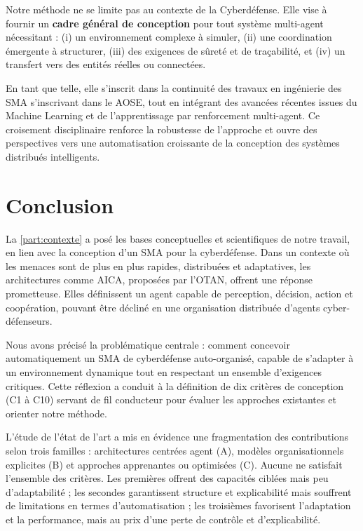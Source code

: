 Notre méthode ne se limite pas au contexte de la Cyberdéfense. Elle vise à fournir un \textbf{cadre général de conception} pour tout système multi-agent nécessitant : (i) un environnement complexe à simuler, (ii) une coordination émergente à structurer, (iii) des exigences de sûreté et de traçabilité, et (iv) un transfert vers des entités réelles ou connectées.

En tant que telle, elle s'inscrit dans la continuité des travaux en ingénierie des \ac{SMA} s'inscrivant dans le \ac{AOSE}, tout en intégrant des avancées récentes issues du Machine Learning et de l'apprentissage par renforcement multi-agent. Ce croisement disciplinaire renforce la robustesse de l'approche et ouvre des perspectives vers une automatisation croissante de la conception des systèmes distribués intelligents.


\chapter*{Conclusion}

La \autoref{part:contexte} a posé les bases conceptuelles et scientifiques de notre travail, en lien avec la conception d'un \ac{SMA} pour la cyberdéfense. Dans un contexte où les menaces sont de plus en plus rapides, distribuées et adaptatives, les architectures comme \ac{AICA}, proposées par l'\ac{OTAN}, offrent une réponse prometteuse. Elles définissent un agent capable de perception, décision, action et coopération, pouvant être décliné en une organisation distribuée d'agents cyber-défenseurs.

Nous avons précisé la problématique centrale : comment concevoir automatiquement un \ac{SMA} de cyberdéfense auto-organisé, capable de s'adapter à un environnement dynamique tout en respectant un ensemble d'exigences critiques. Cette réflexion a conduit à la définition de dix critères de conception (C1 à C10) servant de fil conducteur pour évaluer les approches existantes et orienter notre méthode.

L'étude de l'état de l'art a mis en évidence une fragmentation des contributions selon trois familles : architectures centrées agent (A), modèles organisationnels explicites (B) et approches apprenantes ou optimisées (C). Aucune ne satisfait l'ensemble des critères. Les premières offrent des capacités ciblées mais peu d'adaptabilité ; les secondes garantissent structure et explicabilité mais souffrent de limitations en termes d'automatisation ; les troisièmes favorisent l'adaptation et la performance, mais au prix d'une perte de contrôle et d'explicabilité.

